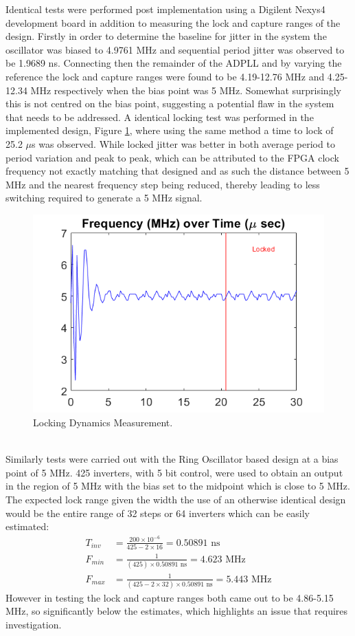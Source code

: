 \documentclass[11pt,english,british]{report}
\begin{document}
Identical tests were performed post implementation using a Digilent Nexys4 development board in addition to measuring the lock and capture ranges of the design. Firstly in order to determine the baseline for jitter in the system the oscillator was biased to 4.9761 MHz and sequential period jitter was observed to be 1.9689 ns. Connecting then the remainder of the ADPLL and by varying the reference the lock and capture ranges were found to be 4.19-12.76 MHz and 4.25-12.34 MHz respectively when the bias point was 5 MHz. Somewhat surprisingly this is not centred on the bias point, suggesting a potential flaw in the system that needs to be addressed. A identical locking test was performed in the implemented design, Figure \ref{fig:impl}, where using the same method a time to lock of 25.2 $\mu$s was observed. While locked jitter was better in both average period to period variation and peak to peak, which can be attributed to the FPGA clock frequency not exactly matching that designed and as such the distance between 5 MHz and the nearest frequency step being reduced, thereby leading to less switching required to generate a 5 MHz signal.
\begin{figure}[h]
	\centering
	\includegraphics[scale=0.45]{../sim_locking_rect}
	\caption{Locking Dynamics Measurement.}
	\label{fig:impl}
\end{figure}\\
Similarly tests were carried out with the Ring Oscillator based design at a bias point of 5 MHz. 425 inverters, with 5 bit control, were used to obtain an output in the region of 5 MHz with the bias set to the midpoint which is close to 5 MHz. The expected lock range given the width the use of an otherwise identical design would be the entire range of 32 steps or 64 inverters which can be easily estimated:
\begin{align*}
	T_{inv} &= \frac{200\times 10^{-6}}{425-2\times 16} = 0.50891\textrm{~ns} \\
	F_{min} &= \frac{1}{(425)\times 0.50891\textrm{~ns}} = 4.623\textrm{~MHz} \\
	F_{max} &= \frac{1}{(425-2\times 32)\times 0.50891\textrm{~ns}} = 5.443\textrm{~MHz}
\end{align*}
However in testing the lock and capture ranges both came out to be 4.86-5.15 MHz, so significantly below the estimates, which highlights an issue that requires investigation.\\
\end{document}
